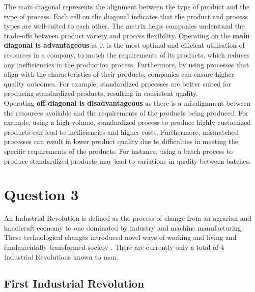 \documentclass[12pt]{article}
\begin{document}
The main diagonal represents the alignment between the type of product and the type of process. Each cell on the diagonal indicates that the product and process types are well-suited to each other. The matrix helps companies understand the trade-offs between product variety and process flexibility. Operating on the \textbf{main diagonal is advantageous} as it is the most optimal and efficient utilisation of resources in a company, to match the requirements of its products, which reduces any inefficiencies in the production process. Furthermore, by using processes that align with the characteristics of their products, companies can ensure higher quality outcomes. For example, standardized processes are better suited for producing standardized products, resulting in consistent quality. \\ 

\noindent Operating \textbf{off-diagonal is disadvantageous} as there is a misalignment between the resources available and the requirements of the products being produced. For example, using a high-volume, standardized process to produce highly customized products can lead to inefficiencies and higher costs. Furthermore, mismatched processes can result in lower product quality due to difficulties in meeting the specific requirements of the products. For instance, using a batch process to produce standardized products may lead to variations in quality between batches.

\newpage

\section*{Question 3}



An Industrial Revolution is defined as the process of change from an agrarian and handicraft economy to one dominated by industry and machine manufacturing. These technological changes introduced novel ways of working and living and fundamentally transformed society \cite{Britannica_2024}. There are currently only a total of 4 Industrial Revolutions known to man. 

\subsection*{First Industrial Revolution}
\end{document}
